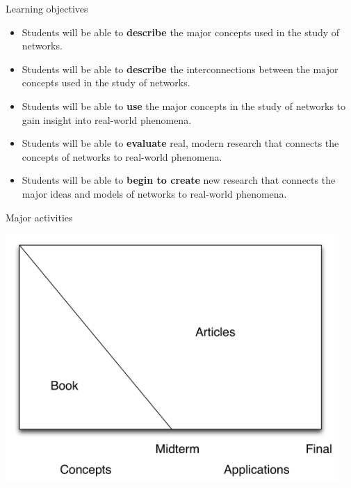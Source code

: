 \documentclass{beamer}
\begin{document}
\begin{frame}

\begin{center}
\Large{Learning objectives}
\end{center}

\end{frame}
\begin{frame}

\begin{itemize}
\item Students will be able to \textbf{describe} the major concepts used in the study of networks.
\pause
\item Students will be able to \textbf{describe} the interconnections between the major concepts used in the study of networks.
\pause
\item Students will be able to \textbf{use} the major concepts in the study of networks to gain insight into real-world phenomena.
\pause
\item Students will be able to \textbf{evaluate} real, modern research that connects the concepts of networks to real-world phenomena.
\pause
\item Students will be able to \textbf{begin to create} new research that connects the major ideas and models of networks to real-world phenomena.
\end{itemize}

\end{frame}
\begin{frame}

\begin{center}
\Large{Major activities}
\end{center}

\end{frame}
\begin{frame}

\begin{center}
\includegraphics[width=0.95\textwidth]{figures/class_structure}
\end{center}

\end{frame}
\end{document}
